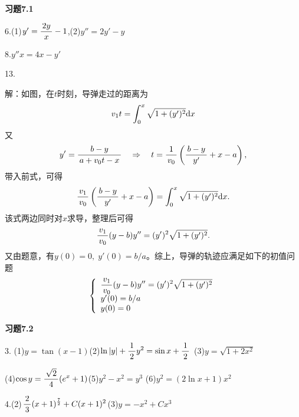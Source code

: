{\bf 习题7.1}

\bigskip

6.\;(1)$y'=\displaystyle\frac{\,{2y}\,}{\,{x}\,}-1$,\quad (2)$y''=2y'-y$

\bigskip

8.\;$y''x=4x-y'$

\bigskip

13.

\begin{center}
\end{center}

解：如图，在$t$时刻，导弹走过的距离为
$$v_1t=\displaystyle\int_0^x\sqrt{1+(y')^2}\mathrm{d} x$$
又
$$y'=\displaystyle\frac{\,{b-y}\,}{\,{a+v_0t-x}\,}\quad\Rightarrow\quad
t=\displaystyle\frac{\,{1}\,}{\,{v_0}\,}\left(\displaystyle\frac{\,{b-y}\,}{\,{y'}\,}+x-a\right),$$
带入前式，可得
$$\displaystyle\frac{\,{v_1}\,}{\,{v_0}\,}\left(\displaystyle\frac{\,{b-y}\,}{\,{y'}\,}+x-a\right)=\displaystyle\int_0^x\sqrt{1+(y')^2}\mathrm{d}
x.$$
该式两边同时对$x$求导，整理后可得
$$\displaystyle\frac{\,{v_1}\,}{\,{v_0}\,}(y-b)y''=(y')^2\sqrt{1+(y')^2}.$$
又由题意，有$y(0)=0,\;y'(0)=b/a$。综上，导弹的轨迹应满足如下的初值问题
$$
\left\{\begin{array}{l}
\displaystyle\frac{\,{v_1}\,}{\,{v_0}\,}(y-b)y''=(y')^2\sqrt{1+(y')^2}\\
y'(0)=b/a\\
y(0)=0
\end{array}
\right.
$$

\bigskip

{\bf 习题7.2}

\bigskip

3.\; (1)$y=\tan(x-1)$\quad (2)$\ln|y|+\displaystyle\frac{\,{1}\,}{\,{2}\,}y^2=\sin x+\displaystyle\frac{\,{1}\,}{\,{2}\,}$
\quad (3)$y=\sqrt{1+2x^2}$

\quad(4)$\cos y=\displaystyle\frac{\,{\sqrt2}\,}{\,{4}\,}(e^x+1)$\quad(5)$y^2-x^2=y^3$
\quad(6)$y^2=(2\ln x+1)x^2$

\bigskip

4.\;(2)$\displaystyle\frac{\,{2}\,}{\,{3}\,}(x+1)^{\frac72}+C(x+1)^2$\quad(3)$y=-x^2+Cx^3$

